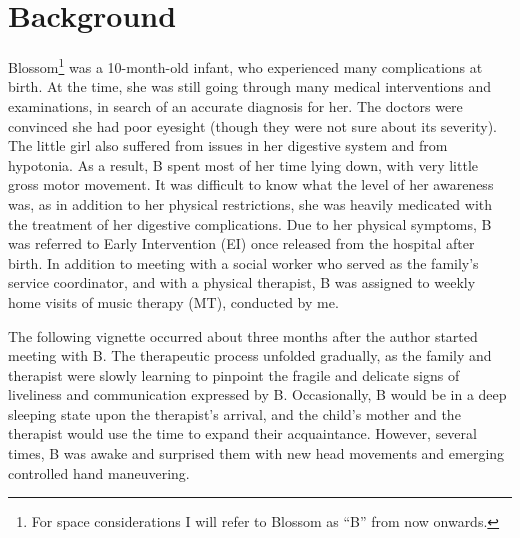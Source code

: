 \documentclass[authordate, empirical]{jote-new-article}
\author[1]{\mbox{Tamar Hadar\orcid{0000-0003-1765-0360}}}
\affil[1]{Western Galilee College; University of Haifa}
\begin{document}
\begin{frontmatter}
  \maketitle
  \begin{abstract}
    \printabstracttext
  \end{abstract}
\end{frontmatter}



	\section{Background}

	Blossom\footnote{ For space considerations I will refer to Blossom as “B” from now onwards.} was a 10-month-old infant, who experienced many complications at birth. At the time, she was still going through many medical interventions and examinations, in search of an accurate diagnosis for her. The doctors were convinced she had poor eyesight (though they were not sure about its severity). The little girl also suffered from issues in her digestive system and from hypotonia. As a result, B spent most of her time lying down, with very little gross motor movement. It was difficult to know what the level of her awareness was, as in addition to her physical restrictions, she was heavily medicated with the treatment of her digestive complications. Due to her physical symptoms, B was referred to Early Intervention (EI) once released from the hospital after birth. In addition to meeting with a social worker who served as the family's service coordinator, and with a physical therapist, B was assigned to weekly home visits of music therapy (MT), conducted by me.



	The following vignette occurred about three months after the author started meeting with B. The therapeutic process unfolded gradually, as the family and therapist were slowly learning to pinpoint the fragile and delicate signs of liveliness and communication expressed by B. Occasionally, B would be in a deep sleeping state upon the therapist's arrival, and the child's mother and the therapist would use the time to expand their acquaintance. However, several times, B was awake and surprised them with new head movements and emerging controlled hand maneuvering.
\end{document}
